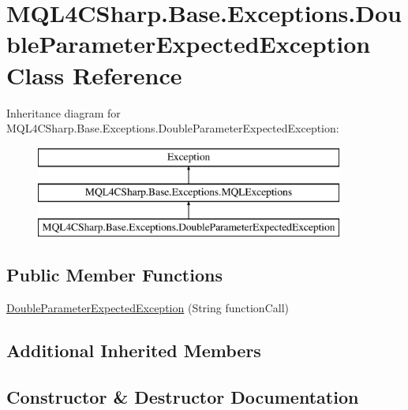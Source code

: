 \hypertarget{class_m_q_l4_c_sharp_1_1_base_1_1_exceptions_1_1_double_parameter_expected_exception}{}\section{M\+Q\+L4\+C\+Sharp.\+Base.\+Exceptions.\+Double\+Parameter\+Expected\+Exception Class Reference}
\label{class_m_q_l4_c_sharp_1_1_base_1_1_exceptions_1_1_double_parameter_expected_exception}
Inheritance diagram for M\+Q\+L4\+C\+Sharp.\+Base.\+Exceptions.\+Double\+Parameter\+Expected\+Exception\+:\begin{figure}[H]
\begin{center}
\leavevmode
\includegraphics[height=3.000000cm]{class_m_q_l4_c_sharp_1_1_base_1_1_exceptions_1_1_double_parameter_expected_exception}
\end{center}
\end{figure}
\subsection*{Public Member Functions}
\begin{DoxyCompactItemize}
\item 
\hyperlink{class_m_q_l4_c_sharp_1_1_base_1_1_exceptions_1_1_double_parameter_expected_exception_a9d73215f4fe9d21e29d1576c3b2c7452}{Double\+Parameter\+Expected\+Exception} (String function\+Call)
\end{DoxyCompactItemize}
\subsection*{Additional Inherited Members}


\subsection{Constructor \& Destructor Documentation}
